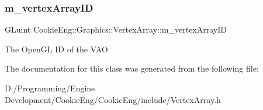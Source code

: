 \subsubsection{\texorpdfstring{m\+\_\+vertex\+Array\+ID}{m\_vertexArrayID}}
{\footnotesize\ttfamily G\+Luint Cookie\+Eng\+::\+Graphics\+::\+Vertex\+Array\+::m\+\_\+vertex\+Array\+ID\hspace{0.3cm}{\ttfamily [protected]}}

The Open\+GL ID of the V\+AO 

The documentation for this class was generated from the following file\+:\begin{DoxyCompactItemize}
\item 
D\+:/\+Programming/\+Engine Development/\+Cookie\+Eng/\+Cookie\+Eng/include/Vertex\+Array.\+h\end{DoxyCompactItemize}

